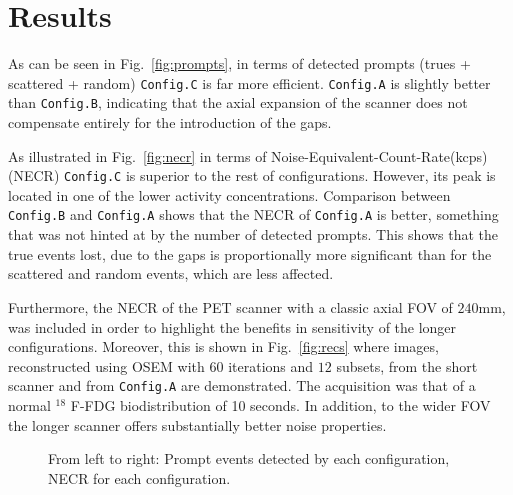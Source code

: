 \documentclass[journal]{IEEEtran}
\begin{document}
\section{Results}
As can be seen in Fig.~\ref{fig:prompts}, in terms of detected prompts (trues + scattered + random) \texttt{Config.C} is far more efficient. \texttt{Config.A} is slightly better than \texttt{Config.B}, indicating that the axial expansion of the scanner does not compensate entirely for the introduction of the gaps. 

As illustrated in Fig.~\ref{fig:necr} in terms of Noise-Equivalent-Count-Rate(kcps) (NECR) \texttt{Config.C} is superior to the rest of configurations. However, its peak is located in one of the lower activity concentrations. Comparison between \texttt{Config.B} and \texttt{Config.A} shows that the NECR of \texttt{Config.A} is better, something that was not hinted at by the number of detected prompts. This shows that the true events lost, due to the gaps is proportionally more significant than for the scattered and random events, which are less affected. 

Furthermore, the NECR of the PET scanner with a classic axial FOV of $240$mm, was included in order to highlight the benefits in sensitivity of the longer configurations. Moreover, this is shown in Fig.~\ref{fig:recs} where images, reconstructed using OSEM with $60$ iterations and $12$ subsets, from the short scanner and from \texttt{Config.A} are demonstrated. The acquisition was that of a normal $^{18}$ F-FDG biodistribution of 10 seconds. In addition, to the wider FOV the longer scanner offers substantially better noise properties. 

\begin{figure}
    \centering
    \caption{From left to right: Prompt events detected by each configuration, NECR for each configuration.}
\end{figure}
\end{document}
